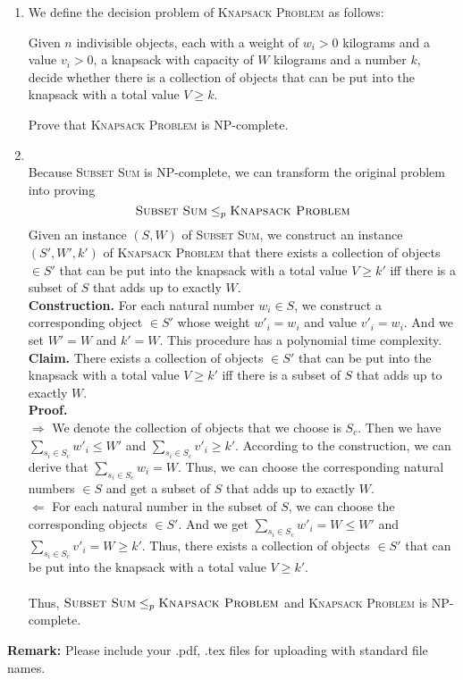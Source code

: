 \documentclass[12pt,a4paper]{article}
\makeatletter
\newtheorem*{solution}{Solution}
\theoremstyle{definition}
\renewenvironment{solution}[1][Solution] {\par\pushQED{\qed}\normalfont\topsep6\p@\@plus6\p@\relax\trivlist\item[\hskip\labelsep\bfseries#1\@addpunct{.}]\ignorespaces}{\popQED\endtrivlist\@endpefalse} \makeatother
\makeatother
\begin{document}
\begin{enumerate}
    \item We define the decision problem of \textsc{Knapsack Problem} as follows:
    
        Given $n$ indivisible objects, each with a weight of $w_i>0$ kilograms and a value $v_i>0$, a knapsack with capacity of $W$ kilograms and a number $k$, decide whether there is a collection of objects that can be put into the knapsack with a total value $V\geqslant k$.
        
    Prove that \textsc{Knapsack Problem} is NP-complete.
    \begin{solution}
    ~\\
    Because \textsc{Subset Sum} is NP-complete, we can transform the original problem into proving
    $$
    \textsc{Subset Sum}\le_p \textsc{Knapsack Problem}
    $$
    Given an instance $(S,W)$ of \textsc{Subset Sum}, we construct an instance $(S',W',k')$ of \textsc{Knapsack Problem} that there exists a collection of objects $\in S'$ that can be put into the knapsack with a total value $V
    \ge k'$ iff there is a subset of $S$ that adds up to exactly $W$.\\
    \textbf{Construction.} For each natural number $w_i\in S$, we construct a corresponding object $\in S'$ whose weight $w'_i=w_i$ and value $v'_i=w_i$. And we set $W'=W$ and $k'=W$. This procedure has a polynomial time complexity.\\
    \textbf{Claim.} There exists a collection of objects $\in S'$ that can be put into the knapsack with a total value $V\ge k'$ iff there is a subset of $S$ that adds up to exactly $W$.\\
    \textbf{Proof.}\\
    $\Longrightarrow$ We denote the collection of objects that we choose is $S_c$. Then we have $\sum_{s_i\in S_c}w'_i\le W'$ and $\sum_{s_i\in S_c}v'_i\ge k'$. According to the construction, we can derive that $\sum_{s_i\in S_c}w_i= W$. Thus, we can choose the corresponding natural numbers $\in S$ and get a subset of $S$ that adds up to exactly $W$.\\
    $\Longleftarrow$ For each natural number in the subset of $S$, we can choose the corresponding objects $\in S'$. And we get  $\sum_{s_i\in S_c}w'_i=W\le W'$ and $\sum_{s_i\in S_c}v'_i=W\ge k'$. Thus, there exists a collection of objects $\in S'$ that can be put into the knapsack with a total value $V\ge k'$.\\
    ~\\
    Thus, $\textsc{Subset Sum}\le_p \textsc{Knapsack Problem}$ and \textsc{Knapsack Problem} is NP-complete.
    \end{solution}
    
\end{enumerate}


\textbf{Remark:} Please include your .pdf, .tex files for uploading with standard file names.
\newpage


\end{document}
